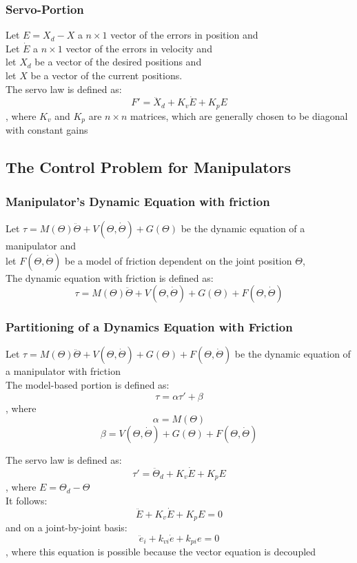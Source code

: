 \documentclass[10pt,a4paper]{article}
\begin{document}
\subsubsection{Servo-Portion}
Let $E = X_d - X$ a $n \times 1$ vector of the errors in position and \\
Let $\dot E$ a $n \times 1$ vector of the errors in velocity and \\
let $X_d$ be a vector of the desired positions and \\
let $X$ be a vector of the current positions. \\
The servo law is defined as:
$$
F' = \ddot X_d + K_v \dot E + K_p E
$$
, where $K_v$ and $K_p$ are $n \times n$ matrices, which are generally chosen to be diagonal with constant gains

\subsection{The Control Problem for Manipulators}
\subsubsection{Manipulator's Dynamic Equation with friction}
Let $\tau = M(\Theta)\ddot{\Theta} + V(\Theta, \dot{\Theta}) + G(\Theta)$ be the dynamic equation of a manipulator and \\
let $F(\Theta, \dot \Theta)$ be a model of friction dependent on the joint position $\Theta$, \\
The dynamic equation with friction is defined as:
$$
\tau = M(\Theta)\ddot{\Theta} + V(\Theta, \dot{\Theta}) + G(\Theta) + F(\Theta, \dot \Theta)
$$

\subsubsection{Partitioning of a Dynamics Equation with Friction}
Let $\tau = M(\Theta)\ddot{\Theta} + V(\Theta, \dot{\Theta}) + G(\Theta) + F(\Theta, \dot \Theta)$ be the dynamic equation of a manipulator with friction \\
The model-based portion is defined as:
$$
\tau = \alpha \tau' + \beta
$$
, where
$$
\alpha = M(\Theta)
$$
$$
\beta = V(\Theta, \dot \Theta) + G(\Theta) + F(\Theta, \dot \Theta)
$$

The servo law is defined as:
$$
\tau' = \ddot \Theta_d + K_v \dot E + K_p E
$$
, where $E = \Theta_d - \Theta$
\\

It follows:
$$
\ddot E + K_v \dot E + K_p E = 0
$$
and on a joint-by-joint basis:
$$
\ddot e_i + k_{vi}\dot e + k_{pi} e = 0
$$
, where this equation is possible because the vector equation is decoupled
\end{document}
